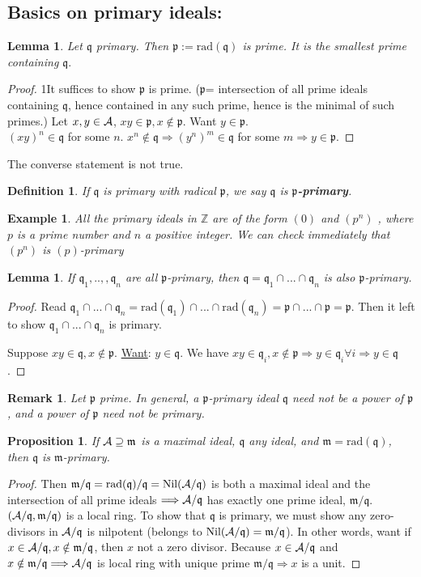 \documentclass[11pt]{article}
\newtheorem{prop}[thm]{Proposition}
\newtheorem{lemma}[thm]{Lemma}
\newtheorem{dfn}[thm]{Definition}
\newtheorem{rmk}[thm]{Remark}
\newtheorem{ex}[thm]{Example}
\newcommand{\intg}{\mathbb Z}
\newcommand{\scm}{{\mathfrak m}}
\newcommand{\scp}{{\mathfrak p}}
\newcommand{\scq}{\mathfrak q}
\newcommand{\cala}{{\cal A}}
\newcommand{\Lrta}{\Longrightarrow}
\begin{document}
\subsection*{Basics on primary ideals:}
\begin{lemma}
Let $\scq$ primary. Then $\scp:=\text{rad}(\scq)$ is prime. It is the smallest prime containing $\scq.$
\end{lemma}
\begin{proof}
1It suffices to show $\scp$ is prime. ($\scp$= intersection of all prime ideals containing $\scq$, hence contained in any such prime, hence is the minimal of such primes.) Let $x,y\in\cala$, $xy\in\scp,x\notin \scp$. Want $y\in\scp$.\\
 $(xy)^n\in\scq$ for some $n$. $x^n\notin\scq\Lrta (y^n)^m\in\scq $ for some $m$$\Lrta  y\in\scp$.
\end{proof}

The converse statement is not true.
\begin{dfn}
If $\scq$ is primary with radical $\scp$, we say $\scq$ is  \textbf{$\scp$-primary}.
\end{dfn}
\begin{ex}
All the primary ideals in $\intg$ are of the form $(0)$ and $(p^n)$ , where $p$ is a prime number and $n$ a positive integer. We can check immediately that $(p^n)$ is $(p)$-primary
\end{ex}
\begin{lemma}
If $\scq_1,..,,\scq_n$ are all $\scp$-primary, then $\scq=\scq_1\cap...\cap \scq_n$ is also $\scp$-primary.
\end{lemma}
\begin{proof}
Read $\scq_1\cap...\cap\scq_n=\text{rad}(\scq_1)\cap...\cap \text{rad}(\scq_n)=\scp\cap...\cap \scp=\scp$. Then it left to show $\scq_1\cap...\cap\scq_n$ is primary. 

Suppose $xy\in\scq, x\notin \scp$. \underline{Want}: $y\in \scq$. We have $xy\in \scq_i,x\notin\scp\Lrta y\in \scq_i\forall i\Lrta y\in\scq$.
\end{proof}
\begin{rmk}
Let $\scp$ prime. In general, a $\scp$-primary ideal $\scq$ need not be a power of $\scp$, and a power of $\scp$ need not be primary.
\end{rmk}
\begin{prop}
If $\cala\supseteq\scm$ is a  maximal ideal, $\scq$ any ideal, and $\scm=\text{rad}(\scq)$, then $\scq$ is $\scm$-primary.
\end{prop}
\begin{proof}
Then $\scm/\scq=\text{rad}(\scq)/\scq=\text{Nil}(  \cala/\scq)$ is both a maximal ideal and the intersection of all prime ideals $\Lrta\cala/\scq$ has exactly one prime ideal, $\scm/\scq$. $(\cala/\scq,\scm/\scq)$ is a local ring. To show that $\scq$ is primary, we must show any zero-divisors  in $\cala/\scq$ is nilpotent (belongs to $\text{Nil}(  \cala/\scq)=\scm/\scq$). In other words, want if $x\in\cala/\scq,x\notin\scm/\scq$, then $x$ not a zero divisor. Because $x\in\cala/\scq $ and $ x\notin \scm/\scq\Lrta \cala/\scq $ is local ring with unique prime $\scm/\scq\Lrta x$ is a unit.
\end{proof}
\end{document}
